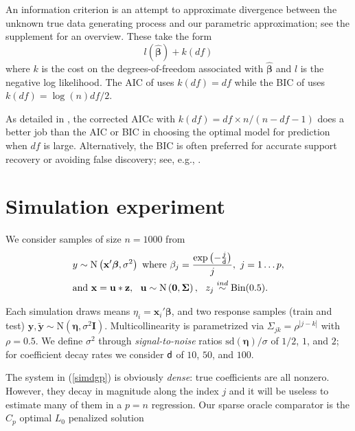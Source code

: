 \documentclass[twoside]{article}
\newcommand{\bs}[1]{\boldsymbol{#1}}
\newcommand{\mr}[1]{\mathrm{#1}}
\newcommand{\bm}[1]{\mathbf{#1}}
\begin{document}
An information criterion is an attempt to approximate
 divergence between the unknown true data generating
process and our parametric approximation; see the supplement for an
overview.  These  take the form
\begin{equation}
l(\bs{\hat\beta}) + k(df)
\end{equation}
where $k$ is the cost on the degrees-of-freedom associated with
 $\bs{\hat\beta}$ and $l$ is the negative log likelihood.  The AIC of
\cite{akaike_information_1973} uses $k(df) = df$ while the BIC of \cite{schwarz_estimating_1978}
uses $k(df) = \log(n)df/2$.

As detailed in \cite{flynn_efficiency_2013}, the corrected AICc with $k(df) =
df\times n/(n-df-1)$ does a better job than the AIC or BIC in choosing the
optimal model for prediction when $df$ is large.  Alternatively, the BIC is often preferred
for accurate support recovery or avoiding false discovery; see, e.g.,
\cite{zou_degrees_2007}.


\section{Simulation experiment}
\label{sec:sim}

We consider samples of size $n=1000$ from
\begin{align}
\label{simdgp}
&y \sim \mr{N}\left(\bm{x}'\bs{\beta},\sigma^2\right)~\text{where}~\beta_j = \frac{\exp\left(-\frac{j}{\sf d}\right)}{j},~j=1\ldots p,\notag\\
&\text{and}~\bm{x} = \bm{u}*\bm{z},~~\bm{u}\sim \mr{N}\left(\bm{0},\bs{\Sigma}\right),~~z_{j} \stackrel{ind}{\sim} \mr{Bin}(0.5).
\end{align}

\vspace{-.4cm}
\noindent
Each simulation draws means $\eta_i =
\bm{x}_i'\bs{\beta}$, and two response samples (train and test)
$\bm{y},\bm{\tilde y} \sim \mr{N}(\bs{\eta},\sigma^2\bm{I})$. Multicollinearity is
parametrized via $\Sigma_{jk} =
\rho^{|j-k|}$ with $\rho = 0.5$.  We define $\sigma^2$ through {\it signal-to-noise} ratios
$\mr{sd}(\bs{\eta})/\sigma$ of $1/2$, $1$, and $2$; for coefficient decay rates we consider
${\sf d}$ of $10$, $50$, and $100$.

The system in (\ref{simdgp}) is obviously {\it dense}:  true
coefficients are all nonzero.  However, they decay in magnitude along the
index $j$ and
it will be useless to estimate many of them in a $p=n$ regression.
Our sparse oracle comparator is the $C_p$ optimal $L_0$ penalized solution
\end{document}

